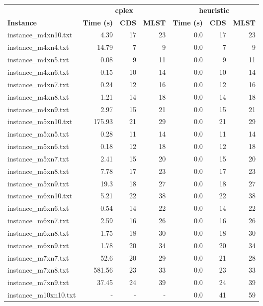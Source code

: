 \documentclass{article}
\begin{document}
\begin{center}
\renewcommand{\arraystretch}{1.4}
 \begin{tabular}{lrrrrrr}
	\hline
 & \multicolumn{3}{c}{\textbf{cplex}} & \multicolumn{3}{c}{\textbf{heuristic}}\\
\textbf{Instance}  & \textbf{Time (s)} & \textbf{CDS} & \textbf{MLST}   & \textbf{Time (s)} & \textbf{CDS} & \textbf{MLST}  \\\hline

instance\_m4xn10.txt & 4.39 & 17 & 23
 & 0.0 & 17 & 23
\\
instance\_m4xn4.txt & 14.79 & 7 & 9
 & 0.0 & 7 & 9
\\
instance\_m4xn5.txt & 0.08 & 9 & 11
 & 0.0 & 9 & 11
\\
instance\_m4xn6.txt & 0.15 & 10 & 14
 & 0.0 & 10 & 14
\\
instance\_m4xn7.txt & 0.24 & 12 & 16
 & 0.0 & 12 & 16
\\
instance\_m4xn8.txt & 1.21 & 14 & 18
 & 0.0 & 14 & 18
\\
instance\_m4xn9.txt & 2.97 & 15 & 21
 & 0.0 & 15 & 21
\\
instance\_m5xn10.txt & 175.93 & 21 & 29
 & 0.0 & 21 & 29
\\
instance\_m5xn5.txt & 0.28 & 11 & 14
 & 0.0 & 11 & 14
\\
instance\_m5xn6.txt & 0.18 & 12 & 18
 & 0.0 & 12 & 18
\\
instance\_m5xn7.txt & 2.41 & 15 & 20
 & 0.0 & 15 & 20
\\
instance\_m5xn8.txt & 7.78 & 17 & 23
 & 0.0 & 17 & 23
\\
instance\_m5xn9.txt & 19.3 & 18 & 27
 & 0.0 & 18 & 27
\\
instance\_m6xn10.txt & 5.21 & 22 & 38
 & 0.0 & 22 & 38
\\
instance\_m6xn6.txt & 0.54 & 14 & 22
 & 0.0 & 14 & 22
\\
instance\_m6xn7.txt & 2.59 & 16 & 26
 & 0.0 & 16 & 26
\\
instance\_m6xn8.txt & 1.75 & 18 & 30
 & 0.0 & 18 & 30
\\
instance\_m6xn9.txt & 1.78 & 20 & 34
 & 0.0 & 20 & 34
\\
instance\_m7xn7.txt & 52.6 & 20 & 29
 & 0.0 & 21 & 28
\\
instance\_m7xn8.txt & 581.56 & 23 & 33
 & 0.0 & 23 & 33
\\
instance\_m7xn9.txt & 37.45 & 24 & 39
 & 0.0 & 24 & 39
\\
instance\_m10xn10.txt & - & - & - 
 & 0.0 & 41 & 59
\\

\end{tabular}
\end{center}
\end{document}

